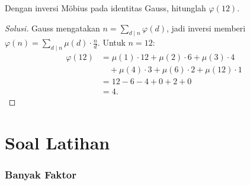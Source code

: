 \documentclass[12pt]{scrartcl}
\begin{document}
\begin{example}
Dengan inversi M\"obius pada identitas Gauss, hitunglah $\varphi(12)$.
\end{example}
\begin{proof}[Solusi]
Gauss mengatakan $n = \sum_{d \mid n} \varphi(d)$,
jadi inversi memberi $\varphi(n) = \sum_{d \mid n} \mu(d) \cdot \frac{n}{d}$.
Untuk $n = 12$:
\begin{align*}
\varphi(12) &= \mu(1) \cdot 12 + \mu(2) \cdot 6 + \mu(3) \cdot 4 \\
&\quad + \mu(4) \cdot 3 + \mu(6) \cdot 2 + \mu(12) \cdot 1 \\
&= 12 - 6 - 4 + 0 + 2 + 0 \\
&= 4.
\end{align*}
\end{proof}

\part*{Soal Latihan}

\section{Banyak Faktor}
\end{document}
